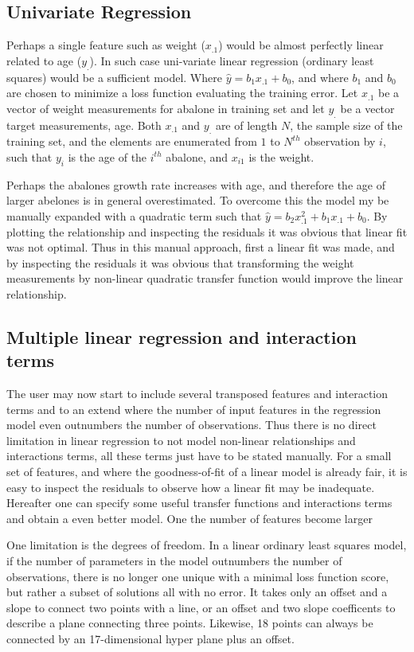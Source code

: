 \subsection{Univariate Regression}
Perhaps a single feature such as weight ($x_{.1}$) would be almost perfectly linear related to age ($y_.$). In such case uni-variate linear regression (ordinary least squares) would be a sufficient model. Where $\hat{y} = b_1 x_{.1} + b_0$, and where $b_1$ and $b_0$ are chosen to minimize a loss function evaluating the training error. Let $x_{.1}$ be a vector of weight measurements for abalone in training set and let $y_.$ be a vector target measurements, age. Both $x_.1$ and $y_.$ are of length $N$, the sample size of the training set, and the elements are enumerated from $1$ to $N^{th}$ observation by $i$, such that $y_i$ is the age of the $i^{th}$ abalone, and $x_{i1}$ is the weight.

Perhaps the abalones growth rate increases with age, and therefore the age of larger abelones is in general overestimated. To overcome this the model my be manually expanded with a quadratic term such that $\hat{y} = b_2 x_{.1}^2 + b_1 x_{.1} + b_0$. By plotting the relationship and inspecting the residuals it was obvious that linear fit was not optimal. Thus in this manual approach, first a linear fit was made, and by inspecting the residuals it was obvious that transforming the weight measurements by non-linear quadratic transfer function would improve the linear relationship.

\subsection{Multiple linear regression and interaction terms}
The user may now start to include several transposed features and interaction terms and to an extend where the number of input features in the regression model even outnumbers the number of observations. Thus there is no direct limitation in linear regression to not model non-linear relationships and interactions terms, all these terms just have to be stated manually. For a small set of features, and where the goodness-of-fit of a linear model is already fair, it is easy to inspect the residuals to observe how a linear fit may be inadequate. Hereafter one can specify some useful transfer functions and interactions terms and obtain a even better model. One the number of features become larger

One limitation is the degrees of freedom. In a linear ordinary least squares model, if the number of parameters in the model outnumbers the number of observations, there is no longer one unique with a minimal loss function score, but rather a subset of solutions all with no error. It takes only an offset and a slope to connect two points with a line, or an offset and two slope coefficents to describe a plane connecting three points. Likewise, 18 points can always be connected by an 17-dimensional hyper plane plus an offset.

